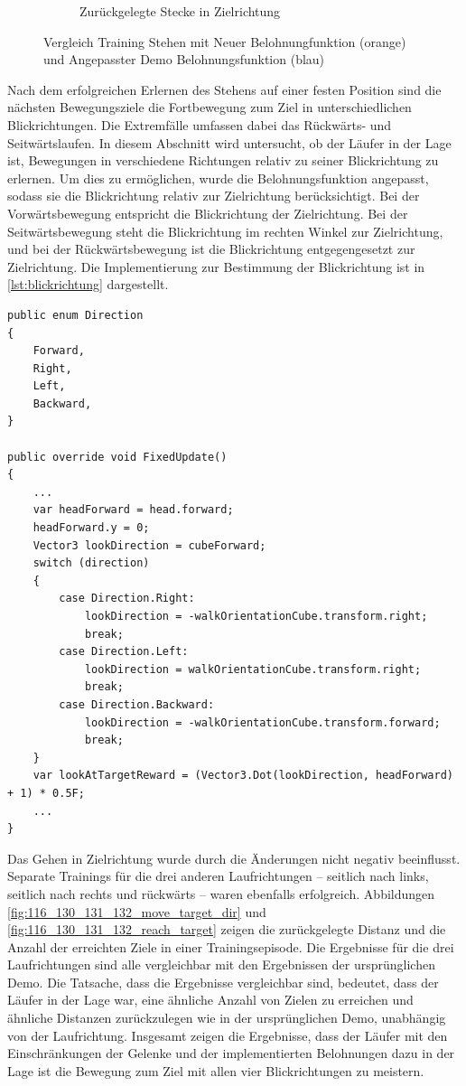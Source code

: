 \begin{figure}[H]
\begin{subfigure}{.49\textwidth}
      \caption{Zurückgelegte Stecke in Zielrichtung}
      \label{fig:126_128_move_target_dir}
    \end{subfigure}
  \caption{Vergleich Training Stehen mit Neuer Belohnungfunktion (orange) und Angepasster Demo Belohnungsfunktion (blau)}
  \label{fig:vergleich_126_128}
\end{figure}

Nach dem erfolgreichen Erlernen des Stehens auf einer festen Position sind die nächsten Bewegungsziele die Fortbewegung zum Ziel in unterschiedlichen Blickrichtungen. Die Extremfälle umfassen dabei das Rückwärts- und Seitwärtslaufen. In diesem Abschnitt wird untersucht, ob der Läufer in der Lage ist, Bewegungen in verschiedene Richtungen relativ zu seiner Blickrichtung zu erlernen. Um dies zu ermöglichen, wurde die Belohnungsfunktion angepasst, sodass sie die Blickrichtung relativ zur Zielrichtung berücksichtigt. Bei der Vorwärtsbewegung entspricht die Blickrichtung der Zielrichtung. Bei der Seitwärtsbewegung steht die Blickrichtung im rechten Winkel zur Zielrichtung, und bei der Rückwärtsbewegung ist die Blickrichtung entgegengesetzt zur Zielrichtung. Die Implementierung zur Bestimmung der Blickrichtung ist in \ref{lst:blickrichtung} dargestellt.

\begin{lstlisting}[caption={Blickrichtung Enum und Belohnung},captionpos=b,label={lst:blickrichtung}]
public enum Direction
{
    Forward,
    Right,
    Left,
    Backward,
}
    
public override void FixedUpdate()
{
    ...
    var headForward = head.forward;
    headForward.y = 0;
    Vector3 lookDirection = cubeForward;
    switch (direction)
    {
        case Direction.Right:
            lookDirection = -walkOrientationCube.transform.right;
            break;
        case Direction.Left:
            lookDirection = walkOrientationCube.transform.right;
            break;
        case Direction.Backward:
            lookDirection = -walkOrientationCube.transform.forward;
            break;
    }
    var lookAtTargetReward = (Vector3.Dot(lookDirection, headForward) + 1) * 0.5F;
    ...
}
\end{lstlisting}

Das Gehen in Zielrichtung wurde durch die Änderungen nicht negativ beeinflusst. Separate Trainings für die drei anderen Laufrichtungen – seitlich nach links, seitlich nach rechts und rückwärts – waren ebenfalls erfolgreich. Abbildungen \ref{fig:116_130_131_132_move_target_dir} und \ref{fig:116_130_131_132_reach_target} zeigen die zurückgelegte Distanz und die Anzahl der erreichten Ziele in einer Trainingsepisode. Die Ergebnisse für die drei Laufrichtungen sind alle vergleichbar mit den Ergebnissen der ursprünglichen Demo. Die Tatsache, dass die Ergebnisse  \grqq{}vergleichbar \grqq{} sind, bedeutet, dass der Läufer in der Lage war, eine ähnliche Anzahl von Zielen zu erreichen und ähnliche Distanzen zurückzulegen wie in der ursprünglichen Demo, unabhängig von der Laufrichtung. Insgesamt zeigen die Ergebnisse, dass der Läufer mit den Einschränkungen der Gelenke und der implementierten Belohnungen dazu in der Lage ist die Bewegung zum Ziel mit allen vier Blickrichtungen zu meistern.


